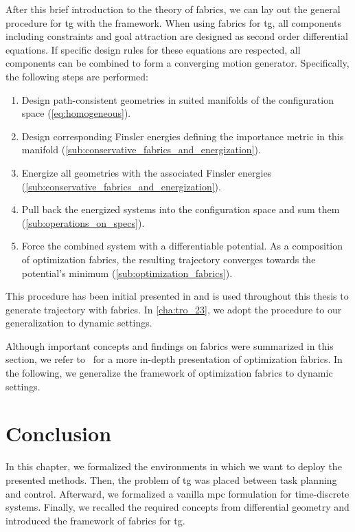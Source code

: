 After this brief introduction to the theory of \ac{fabrics},
we can lay out the general procedure for \ac{tg} with the
framework.
When using \ac{fabrics} for \ac{tg}, all
components including constraints and goal attraction are
designed as second order differential equations. If specific
design rules for these equations are respected, all
components can be combined to form a converging motion
generator. Specifically, the following steps are performed:
%
\begin{enumerate}
  \item Design path\hyp{}consistent geometries in suited manifolds of the configuration space
    (\cref{eq:homogeneous}).
  \item Design corresponding Finsler energies defining the importance metric in this manifold
    (\cref{sub:conservative_fabrics_and_energization}).
  \item Energize all geometries with the associated Finsler energies 
    (\cref{sub:conservative_fabrics_and_energization}).
  \item Pull back the energized systems into the configuration space and sum them 
    (\cref{sub:operations_on_specs}).
  \item Force the combined system with a differentiable potential. As a composition of optimization fabrics, 
    the resulting trajectory converges towards the potential's minimum
    (\cref{sub:optimization_fabrics}).
\end{enumerate}

This procedure has been initial presented in
\cite{Ratliff2020} and is used throughout this thesis to
generate trajectory with \ac{fabrics}. In \cref{cha:tro_23},
we adopt the procedure to our generalization to dynamic
settings.

Although important concepts and findings on \ac{fabrics} were summarized in this
section, we refer to~\cite{Ratliff2020} for a more in-depth presentation of optimization
fabrics. In the following, we generalize the framework of optimization fabrics to dynamic settings.

\section{Conclusion}%
\label{sec:background_conclusion}

In this chapter, we formalized the environments in which we
want to deploy the presented methods. Then, the problem of
\ac{tg} was placed between task planning and control.
Afterward, we formalized a vanilla \ac{mpc} formulation for
time-discrete systems. Finally, we recalled the required
concepts from differential geometry and introduced the
framework of \ac{fabrics} for \ac{tg}.


